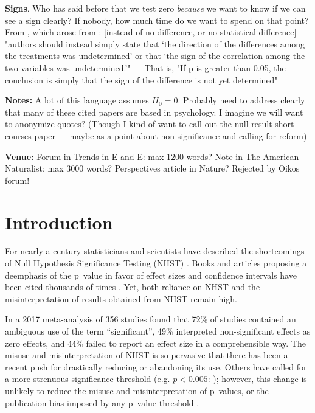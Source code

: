 \textbf{Signs}.
Who has said before that we test zero \emph{because} we want to know if we can see a sign clearly? If nobody, how much time do we want to spend on that point? 
From \citet{robinson2001past}, which arose from \citet{jones2000sensible}: [instead of no difference, or no statistical difference] "authors should instead simply state that `the direction of the differences among the treatments was undetermined' or that `the sign of the correlation among the two variables was undetermined.'" --- That is, "If p is greater than 0.05, the conclusion is simply that the sign of the difference is not yet determined"

\textbf{Notes:} A lot of this language assumes $H_{0} = 0$. Probably need to address clearly that many of these cited
papers are based in psychology.
I imagine we will want to anonymize quotes? (Though I kind of want to call out the null
result short courses paper --- maybe as a point about non-significance and calling for reform)

\textbf{Venue:} Forum in Trends in E and E: max 1200 words?
Note in The American Naturalist: max 3000 words? Perspectives article in Nature?
Rejected by Oikos forum!

\clearpage

\section*{Introduction}

For nearly a century statisticians and scientists have described the shortcomings of Null Hypothesis Significance Testing (NHST) \citep[see][]{Cohen1994}.
Books and articles proposing a deemphasis of the p~value in favor of effect sizes and confidence intervals have been cited thousands of times \citep{Cohen1994, Goodman1999, Wilkinson1999, ZiliakandMcCloskey2008, WassersteinandLazar2016}.
Yet, both reliance on NHST and the misinterpretation of results obtained from NHST remain high.

In a 2017 meta-analysis of 356 studies \citet{Bernardietal.2017} found that 72\% of studies contained an ambiguous use of the term ``significant'', 
49\% interpreted non-significant effects as zero effects, and 44\% failed to report an effect size in a comprehensible 
way.
The misuse and misinterpretation of NHST is so pervasive that there has been a recent push for drastically reducing 
\citep{SzucsandIoannidis2017} or abandoning \citep{McShaneetal.2017} its use.
Others have called for a more
strenuous significance threshold (e.g.
$p < 0.005$: \citealt{Benjaminetal.2018}); however, this change is unlikely to reduce
the misuse and misinterpretation of p~values, or the publication bias imposed by any p~value threshold \citep{Ridleyetal.2007}.

